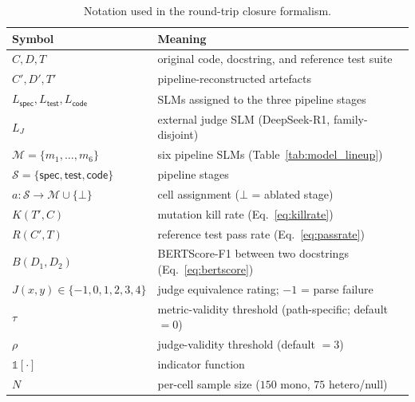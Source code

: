 

\begin{table}[h]
\centering
\small
\caption{Notation used in the round-trip closure formalism.}
\label{tab:notation}
\begin{tabular}{ll}
\toprule
Symbol & Meaning \\
\midrule
$C, D, T$ & original code, docstring, and reference test suite \\
$C', D', T'$ & pipeline-reconstructed artefacts \\
$L_{\textsf{spec}}, L_{\textsf{test}}, L_{\textsf{code}}$ & SLMs assigned to the three pipeline stages \\
$L_J$ & external judge SLM (DeepSeek-R1, family-disjoint) \\
$\mathcal{M} = \{m_1, \ldots, m_6\}$ & six pipeline SLMs (Table~\ref{tab:model_lineup}) \\
$\mathcal{S} = \{\textsf{spec}, \textsf{test}, \textsf{code}\}$ & pipeline stages \\
$a : \mathcal{S} \to \mathcal{M} \cup \{\bot\}$ & cell assignment ($\bot$ = ablated stage) \\
$K(T', C)$ & mutation kill rate (Eq.~\ref{eq:killrate}) \\
$R(C', T)$ & reference test pass rate (Eq.~\ref{eq:passrate}) \\
$B(D_1, D_2)$ & BERTScore-F1 between two docstrings (Eq.~\ref{eq:bertscore}) \\
$J(x, y) \in \{-1, 0, 1, 2, 3, 4\}$ & judge equivalence rating; $-1$ = parse failure \\
$\tau$ & metric-validity threshold (path-specific; default $= 0$) \\
$\rho$ & judge-validity threshold (default $= 3$) \\
$\mathds{1}[\cdot]$ & indicator function \\
$N$ & per-cell sample size ($150$ mono, $75$ hetero/null) \\
\bottomrule
\end{tabular}
\end{table}

